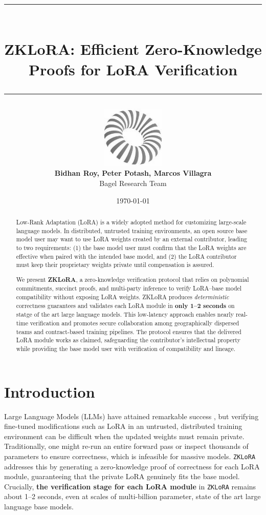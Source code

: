 \documentclass[11pt]{article}
\title{
    \vspace*{-1.5em}
    \rule{\textwidth}{0.4pt} \\[0.4em]
    \textbf{ZKLoRA: Efficient Zero-Knowledge Proofs for LoRA Verification} \\[0.4em]
    \rule{\textwidth}{0.4pt}
}
\author{ \includegraphics[height=8em]{figs/bagel-logo-bw.png} \\
    \textbf{Bidhan Roy, Peter Potash, Marcos Villagra} \\
    Bagel Research Team\footnotemark[1] \\
}
\date{\today}
\begin{document}
\maketitle


\begin{abstract}
  Low-Rank Adaptation (LoRA) is a widely adopted method for customizing large-scale language models. In distributed, untrusted training environments, an open source base model user may want to use LoRA weights created by an external contributor, leading to two requirements: (1) the base model user must confirm that the LoRA weights are effective when paired with the intended base model, and (2) the LoRA contributor must keep their proprietary weights private until compensation is assured.

  We present \textbf{ZKLoRA}, a zero-knowledge verification protocol that relies on polynomial commitments, succinct proofs, and multi-party inference to verify LoRA–base model compatibility without exposing LoRA weights. ZKLoRA produces \emph{deterministic} correctness guarantees and validates each LoRA module in \textbf{only 1--2 seconds} on statge of the art large language models. This low-latency approach enables nearly real-time verification and promotes secure collaboration among geographically dispersed teams and contract-based training pipelines. The protocol ensures that the delivered LoRA module works as claimed, safeguarding the contributor’s intellectual property while providing the base model user with verification of compatibility and lineage.
\end{abstract}

\section{Introduction}
Large Language Models (LLMs) have attained remarkable success \cite{brown2020language, devlin2018bert}, but verifying fine-tuned modifications such as LoRA \cite{hu2021lora} in an untrusted, distributed training environment can be difficult when the updated weights must remain private. 
Traditionally, one might re-run an entire forward pass or inspect thousands of parameters to ensure correctness, which is infeasible for massive models. 
\texttt{ZKLoRA} addresses this by generating a zero-knowledge proof of correctness for each LoRA module, guaranteeing that the private LoRA genuinely fits the base model. 
Crucially, \textbf{the verification stage for each LoRA module} in \texttt{ZKLoRA} remains about 1--2 seconds, even at scales of multi-billion parameter, state of the art large language base models.
\end{document}
